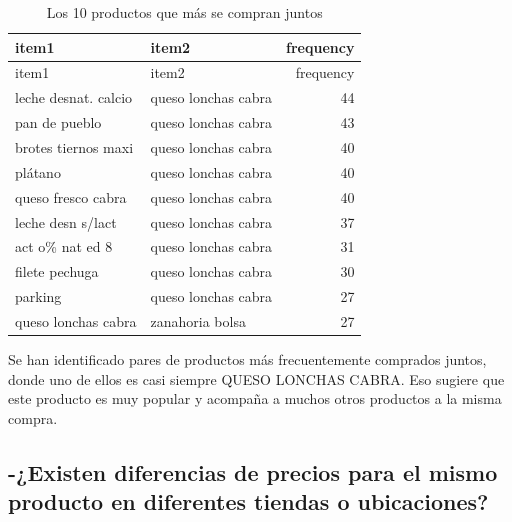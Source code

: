 \documentclass[,article,submit,moreauthors,pdftex]{Definitions/mdpi}
\begin{document}
\begin{longtable}[]{@{}llr@{}}
\caption{Los 10 productos que más se compran juntos}\tabularnewline
\toprule\noalign{}
item1 & item2 & frequency \\
\midrule\noalign{}
\endfirsthead
\toprule\noalign{}
item1 & item2 & frequency \\
\midrule\noalign{}
\endhead
\bottomrule\noalign{}
\endlastfoot
leche desnat. calcio & queso lonchas cabra & 44 \\
pan de pueblo & queso lonchas cabra & 43 \\
brotes tiernos maxi & queso lonchas cabra & 40 \\
plátano & queso lonchas cabra & 40 \\
queso fresco cabra & queso lonchas cabra & 40 \\
leche desn s/lact & queso lonchas cabra & 37 \\
act o\% nat ed 8 & queso lonchas cabra & 31 \\
filete pechuga & queso lonchas cabra & 30 \\
parking & queso lonchas cabra & 27 \\
queso lonchas cabra & zanahoria bolsa & 27 \\
\end{longtable}

Se han identificado pares de productos más frecuentemente comprados
juntos, donde uno de ellos es casi siempre QUESO LONCHAS CABRA. Eso
sugiere que este producto es muy popular y acompaña a muchos otros
productos a la misma compra.

\hypertarget{existen-diferencias-de-precios-para-el-mismo-producto-en-diferentes-tiendas-o-ubicaciones}{%
\subsection{-¿Existen diferencias de precios para el mismo producto en
diferentes tiendas o
ubicaciones?}\label{existen-diferencias-de-precios-para-el-mismo-producto-en-diferentes-tiendas-o-ubicaciones}}
\end{document}
